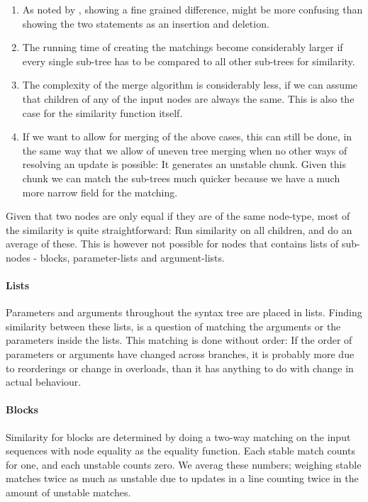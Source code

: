\documentclass[11pt]{article}
\begin{document}
\begin{enumerate}
\item As noted by \citet{Hashimoto}, showing a fine grained difference, might be more confusing than showing the two statements as an insertion and deletion.
\item The running time of creating the matchings become considerably larger if every single sub-tree has to be compared to all other sub-trees  for similarity.
\item The complexity of the merge algorithm is considerably less, if we can assume that children of any of the input nodes are always the same. This is also the case for the similarity function itself.
\item If we want to allow for merging of the above cases, this can still be done, in the same way that we allow of uneven tree merging when no other ways of resolving an update is possible: It generates an unstable chunk. Given this chunk we can match the sub-trees much quicker because we have a much more narrow field for the matching.
\end{enumerate}

Given that two nodes are only equal if they are of the same node-type, most of the similarity is quite straightforward: Run similarity on all children, and do an average of these. This is however not possible for nodes that contains lists of sub-nodes - blocks, parameter-lists and argument-lists.

\paragraph{Lists} Parameters and arguments throughout the syntax tree are placed in lists. Finding similarity between these lists, is a question of matching the arguments or the parameters inside the lists. This matching is done without order: If the order of parameters or arguments have changed across branches, it is probably more due to reorderings or change in overloads, than it has anything to do with change in actual behaviour.

\paragraph{Blocks} Similarity for blocks are determined by doing a two-way matching on the input sequences with node equality as the equality function. Each stable match counts for one, and each unstable counts zero. We averag these numbers; weighing stable matches twice as much as unstable due to updates in a line counting twice in the amount of unstable matches.
\end{document}
